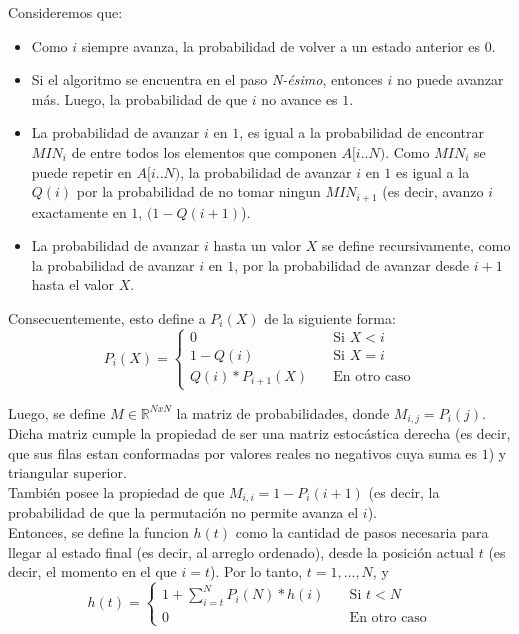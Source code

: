 \noindent Consideremos que:
\begin{itemize}
	\item Como $i$ siempre avanza, la probabilidad de volver a un estado anterior es $0$.
	\item Si el algoritmo se encuentra en el paso \emph{N-ésimo}, entonces $i$ no puede avanzar más. Luego, la probabilidad de que $i$ no avance es $1$.
	\item La probabilidad de avanzar $i$ en $1$, es igual a la probabilidad de encontrar $MIN_i$ de entre todos los elementos que componen $A[i..N)$. Como $MIN_i$ se puede repetir en $A[i..N)$, la probabilidad de avanzar $i$ en $1$ es igual a la $Q(i)$ por la probabilidad de no tomar ningun $MIN_{i+1}$ (es decir, avanzo $i$ exactamente en $1$, $(1-Q(i+1)$).
	\item La probabilidad de avanzar $i$ hasta un valor $X$ se define recursivamente, como la probabilidad de avanzar $i$ en $1$, por la probabilidad de avanzar desde $i+1$ hasta el valor $X$.
\end{itemize}

\noindent Consecuentemente, esto define a $P_i(X)$ de la siguiente forma:
\[
	P_i(X) = 
		\begin{cases}
			0 & \quad \text{Si }X < i \\
			1 - Q(i) & \quad \text{Si }X = i \\
			Q(i) * P_{i+1}(X) & \quad \text{En otro caso}
		\end{cases}
\]


Luego, se define $M \in \mathbb{R}^{NxN}$ la matriz de probabilidades, donde $M_{i,j} = P_i(j)$.
Dicha matriz cumple la propiedad de ser una matriz estocástica derecha (es decir, que sus filas estan conformadas por valores reales no negativos cuya suma es $1$) y triangular superior.\\
También posee la propiedad de que $M_{i,i} = 1 - P_i(i+1)$ (es decir, la probabilidad de que la permutación no permite avanza el $i$).\\

Entonces, se define la funcion $h(t)$ como la cantidad de pasos necesaria para llegar al estado final (es decir, al arreglo ordenado), desde la posición actual $t$ (es decir, el momento en el que $i = t$). Por lo tanto, $t = 1,...,N$, y
\[ 
	h(t) = 
	\begin{cases}
		\displaystyle 1 + \sum_{i = t}^{N} P_i(N)*h(i) & \quad \text{Si }t < N \\
		0 & \quad \text{En otro caso}
	\end{cases}
\]

